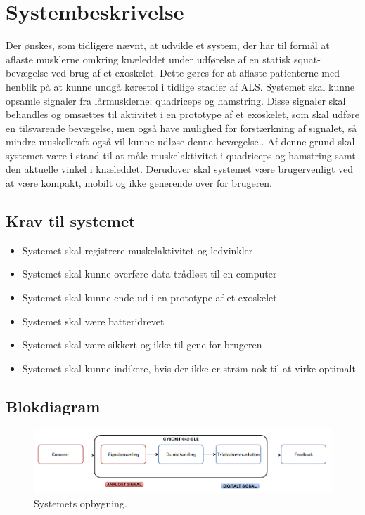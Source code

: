 \section{Systembeskrivelse}
Der ønskes, som tidligere nævnt, at udvikle et system, der har til formål at aflaste musklerne omkring knæleddet under udførelse af en statisk squat-bevægelse ved brug af et exoskelet. Dette gøres for at aflaste patienterne med henblik på at kunne undgå kørestol i tidlige stadier af ALS. Systemet skal kunne opsamle signaler fra lårmusklerne; quadriceps og hamstring. Disse signaler skal behandles og omsættes til aktivitet i en prototype af et exoskelet, som skal udføre en tilsvarende bevægelse, men også have mulighed for forstærkning af signalet, så mindre muskelkraft også vil kunne udløse denne bevægelse.. Af denne grund skal systemet være i stand til at måle muskelaktivitet i quadriceps og hamstring samt den aktuelle vinkel i knæleddet. Derudover skal systemet være brugervenligt ved at være kompakt, mobilt og ikke generende over for brugeren.

\subsection{Krav til systemet} 
\begin{itemize}
\item Systemet skal registrere muskelaktivitet og ledvinkler
\item Systemet skal kunne overføre data trådløst til en computer
\item Systemet skal kunne ende ud i en prototype af et exoskelet
\item Systemet skal være batteridrevet
\item Systemet skal være sikkert og ikke til gene for brugeren
\item Systemet skal kunne indikere, hvis der ikke er strøm nok til at virke optimalt
\end{itemize}


\subsection{Blokdiagram}
\begin{figure}[H]
\centering
\includegraphics[width=1\textwidth]{figures/blokdiagram.png}
\caption{Systemets opbygning.}
\label{fig:blokdiagram}
\end{figure}

